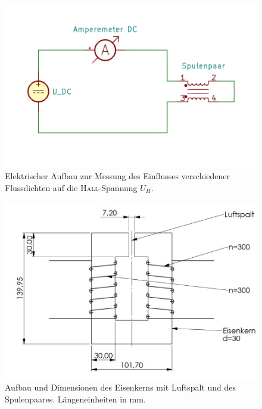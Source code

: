 \begin{figure}[h]
    \centering
    \includegraphics[width=.8\textwidth]{kicad/abbildungen/schematic_messung.jpg}
    \caption[Schaltskizze des Messaufbaus]{Elektrischer Aufbau zur Messung des Einflusses verschiedener Flussdichten auf die \textsc{Hall}-Spannung \(U_H\).}%
    \label{fig:schematicMessung}
\end{figure}


\begin{figure}[h]
    \centering
    \includegraphics[width=.8\textwidth]{CAD/kern.jpg}
    \caption[Skizze des Spulenpaares mit Eiskenkern und Luftspalt]{Aufbau und Dimensionen des Eisenkerns mit Luftspalt und des Spulenpaares. Längeneinheiten in \si{\milli\metre}.}%
    \label{fig:zeichnungKern}
\end{figure}